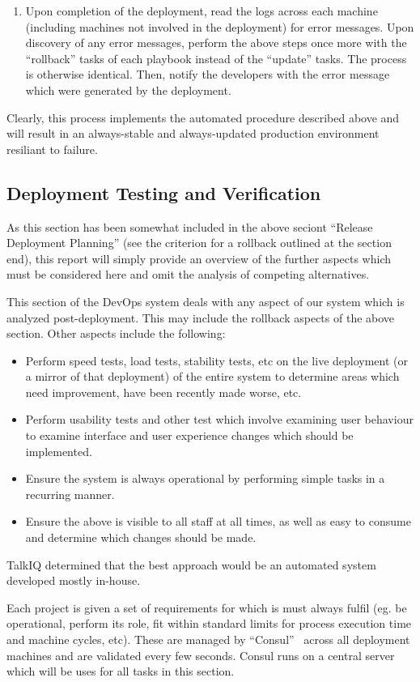 \documentclass[12pt]{article}
\begin{document}
\begin{enumerate}
\item Upon completion of the deployment, read the logs across each machine (including machines not involved in the deployment) for error messages. Upon discovery of any error messages, perform the above steps once more with the ``rollback'' tasks of each playbook instead of the ``update'' tasks. The process is otherwise identical. Then, notify the developers with the error message which were generated by the deployment.
\end{enumerate}

Clearly, this process implements the automated procedure described above and will result in an always-stable and always-updated production environment resiliant to failure.

\subsection{Deployment Testing and Verification}
As this section has been somewhat included in the above seciont ``Release Deployment Planning'' (see the criterion for a rollback outlined at the section end), this report will simply provide an overview of the further aspects which must be considered here and omit the analysis of competing alternatives.

This section of the DevOps system deals with any aspect of our system which is analyzed post-deployment. This may include the rollback aspects of the above section. Other aspects include the following:
\begin{itemize}
\item Perform speed tests, load tests, stability tests, etc on the live deployment (or a mirror of that deployment) of the entire system to determine areas which need improvement, have been recently made worse, etc.
\item Perform usability tests and other test which involve examining user behaviour to examine interface and user experience changes which should be implemented.
\item Ensure the system is always operational by performing simple tasks in a recurring manner.
\item Ensure the above is visible to all staff at all times, as well as easy to consume and determine which changes should be made.
\end{itemize}

TalkIQ determined that the best approach would be an automated system developed mostly in-house.

Each project is given a set of requirements for which is must always fulfil (eg. be operational, perform its role, fit within standard limits for process execution time and machine cycles, etc). These are managed by ``Consul''~\cite{consul} across all deployment machines and are validated every few seconds. Consul runs on a central server which will be uses for all tasks in this section.
\end{document}
